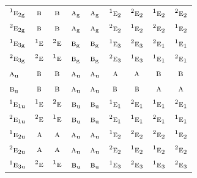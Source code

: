 \documentclass[10pt,a4paper]{article}
\numberwithin{equation}{section}
\newcommand{\irr}[1]{\text{\normalfont\scshape #1}}
\newcommand{\conjpair}[1]{{}^{#1}}
\newcommand{\ptag}[1]{\mathrm{#1}}
\begin{document}
{\begin{longtable}{@{}lcccccccc@{}}
$\conjpair{1}\irr{e}_{2\ptag{g}}$ & $\irr{b}$ & $\irr{b}$ & $\irr{a}_{\ptag{g}}$ & $\irr{a}_{\ptag{g}}$ & $\conjpair{1}\irr{e}_{2}$ & $\conjpair{2}\irr{e}_{2}$ & $\conjpair{1}\irr{e}_{2}$ & $\conjpair{2}\irr{e}_{2}$\\
$\conjpair{2}\irr{e}_{2\ptag{g}}$ & $\irr{b}$ & $\irr{b}$ & $\irr{a}_{\ptag{g}}$ & $\irr{a}_{\ptag{g}}$ & $\conjpair{2}\irr{e}_{2}$ & $\conjpair{1}\irr{e}_{2}$ & $\conjpair{2}\irr{e}_{2}$ & $\conjpair{1}\irr{e}_{2}$\\
$\conjpair{1}\irr{e}_{3\ptag{g}}$ & $\conjpair{1}\irr{e}$ & $\conjpair{2}\irr{e}$ & $\irr{b}_{\ptag{g}}$ & $\irr{b}_{\ptag{g}}$ & $\conjpair{1}\irr{e}_{3}$ & $\conjpair{2}\irr{e}_{3}$ & $\conjpair{2}\irr{e}_{1}$ & $\conjpair{1}\irr{e}_{1}$\\
$\conjpair{2}\irr{e}_{3\ptag{g}}$ & $\conjpair{2}\irr{e}$ & $\conjpair{1}\irr{e}$ & $\irr{b}_{\ptag{g}}$ & $\irr{b}_{\ptag{g}}$ & $\conjpair{2}\irr{e}_{3}$ & $\conjpair{1}\irr{e}_{3}$ & $\conjpair{1}\irr{e}_{1}$ & $\conjpair{2}\irr{e}_{1}$\\
$\irr{a}_{\ptag{u}}$ & $\irr{b}$ & $\irr{b}$ & $\irr{a}_{\ptag{u}}$ & $\irr{a}_{\ptag{u}}$ & $\irr{a}$ & $\irr{a}$ & $\irr{b}$ & $\irr{b}$\\
$\irr{b}_{\ptag{u}}$ & $\irr{b}$ & $\irr{b}$ & $\irr{a}_{\ptag{u}}$ & $\irr{a}_{\ptag{u}}$ & $\irr{b}$ & $\irr{b}$ & $\irr{a}$ & $\irr{a}$\\
$\conjpair{1}\irr{e}_{1\ptag{u}}$ & $\conjpair{1}\irr{e}$ & $\conjpair{2}\irr{e}$ & $\irr{b}_{\ptag{u}}$ & $\irr{b}_{\ptag{u}}$ & $\conjpair{1}\irr{e}_{1}$ & $\conjpair{2}\irr{e}_{1}$ & $\conjpair{1}\irr{e}_{1}$ & $\conjpair{2}\irr{e}_{1}$\\
$\conjpair{2}\irr{e}_{1\ptag{u}}$ & $\conjpair{2}\irr{e}$ & $\conjpair{1}\irr{e}$ & $\irr{b}_{\ptag{u}}$ & $\irr{b}_{\ptag{u}}$ & $\conjpair{2}\irr{e}_{1}$ & $\conjpair{1}\irr{e}_{1}$ & $\conjpair{2}\irr{e}_{1}$ & $\conjpair{1}\irr{e}_{1}$\\
$\conjpair{1}\irr{e}_{2\ptag{u}}$ & $\irr{a}$ & $\irr{a}$ & $\irr{a}_{\ptag{u}}$ & $\irr{a}_{\ptag{u}}$ & $\conjpair{1}\irr{e}_{2}$ & $\conjpair{2}\irr{e}_{2}$ & $\conjpair{2}\irr{e}_{2}$ & $\conjpair{1}\irr{e}_{2}$\\
$\conjpair{2}\irr{e}_{2\ptag{u}}$ & $\irr{a}$ & $\irr{a}$ & $\irr{a}_{\ptag{u}}$ & $\irr{a}_{\ptag{u}}$ & $\conjpair{2}\irr{e}_{2}$ & $\conjpair{1}\irr{e}_{2}$ & $\conjpair{1}\irr{e}_{2}$ & $\conjpair{2}\irr{e}_{2}$\\
$\conjpair{1}\irr{e}_{3\ptag{u}}$ & $\conjpair{2}\irr{e}$ & $\conjpair{1}\irr{e}$ & $\irr{b}_{\ptag{u}}$ & $\irr{b}_{\ptag{u}}$ & $\conjpair{1}\irr{e}_{3}$ & $\conjpair{2}\irr{e}_{3}$ & $\conjpair{1}\irr{e}_{3}$ & $\conjpair{2}\irr{e}_{3}$\\

\end{longtable}}
\end{document}

